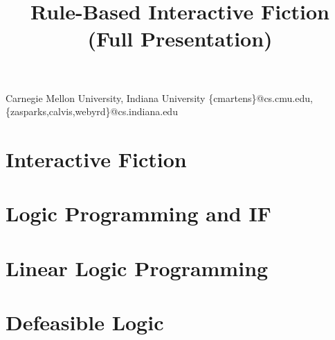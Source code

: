 \documentclass[computermodern]{sigplanconf}
\begin{document}
%

\title{Rule-Based Interactive Fiction (Full Presentation)}


           {Carnegie Mellon University, Indiana University}
           {\{cmartens\}@cs.cmu.edu,\{zasparks,calvis,webyrd\}@cs.indiana.edu}

\maketitle

\section{Interactive Fiction}



\section{Logic Programming and IF}



\section{Linear Logic Programming}



\section{Defeasible Logic}



\acks



\nocite{Covington:1996:PPD:230996}
\nocite{apt03principles}
\nocite{Marriottp98Pwc}
\nocite{trs2005}
\nocite{zarfrulespage}




\end{document}
